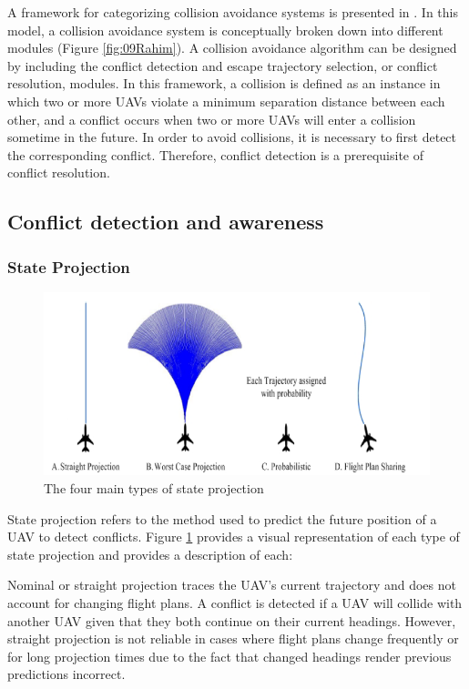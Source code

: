 \documentclass[conference]{IEEEtran}
\begin{document}
A framework for categorizing collision avoidance systems is presented in \cite{albaker2009survey}.  In this model, a collision avoidance system is conceptually broken down into different modules (Figure \ref{fig:09Rahim}).  A collision avoidance algorithm can be designed by including the conflict detection and escape trajectory selection, or conflict resolution, modules.  In this framework, a collision is defined as an instance in which two or more UAVs violate a minimum separation distance between each other, and a conflict occurs when two or more UAVs will enter a collision sometime in the future. In order to avoid collisions, it is necessary to first detect the corresponding conflict.  Therefore, conflict detection is a prerequisite of conflict resolution.

\subsection{Conflict detection and awareness}


\subsubsection{State Projection}

\begin{figure}[h]
	\includegraphics [width=1\columnwidth] {2009RahimProject}
	\caption{The four main types of state projection \cite{albaker2009survey}}
	\label{fig:09RahimProject}
\end{figure}

State projection refers to the method used to predict the future position of a UAV to detect conflicts. Figure \ref{fig:09RahimProject} provides a visual representation of each type of state projection and \cite{albaker2009survey} provides a description of each:

Nominal or straight projection traces the UAV's current trajectory and does not account for changing flight plans.  A conflict is detected if a UAV will collide with another UAV given that they both continue on their current headings.  However, straight projection is not reliable in cases where flight plans change frequently or for long projection times due to the fact that changed headings render previous predictions incorrect.
\end{document}
